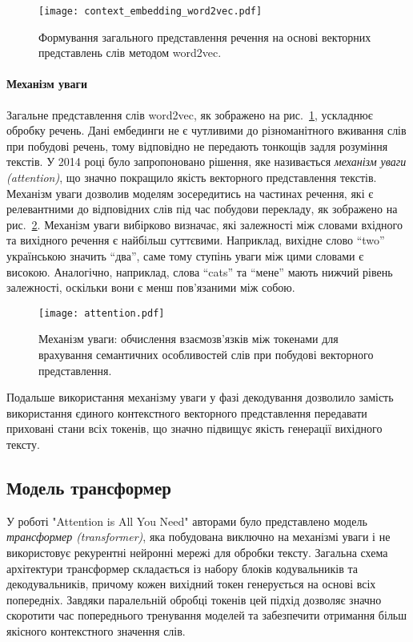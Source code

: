 \begin{figure}[h]
    \centering
    \texttt{[image: context\_embedding\_word2vec.pdf]}
    \caption{Формування загального представлення речення на основі векторних представлень слів методом word2vec.}
    \label{fig:context_embedding_word2vec}
\end{figure}

\paragraph{Механізм уваги}
Загальне представлення слів word2vec, як зображено на рис.~\ref{fig:context_embedding_word2vec}, ускладнює обробку речень. Дані ембединги не є чутливими до різноманітного вживання слів при побудові речень, тому відповідно не передають тонкощів задля розуміння текстів. У 2014 році було запропоновано рішення, яке називається \emph{механізм уваги (attention)}, що значно покращило якість векторного представлення текстів. Механізм уваги дозволив моделям зосередитись на частинах речення, які є релевантними до відповідних слів під час побудови перекладу, як зображено на рис.~\ref{fig:attention}. Механізм уваги вибірково визначає, які залежності між словами вхідного та вихідного речення є найбільш суттєвими. Наприклад, вихідне слово ``two'' українською значить ``два'', саме тому ступінь уваги між цими словами є високою. Аналогічно, наприклад, слова ``cats'' та ``мене'' мають нижчий рівень залежності, оскільки вони є менш пов’язаними між собою.

\begin{figure}[h]
    \centering
    \texttt{[image: attention.pdf]}
    \caption{Механізм уваги: обчислення взаємозв’язків між токенами для врахування семантичних особливостей слів при побудові векторного представлення.}
    \label{fig:attention}
\end{figure}

Подальше використання механізму уваги у фазі декодування дозволило замість використання єдиного контекстного векторного представлення передавати приховані стани всіх токенів, що значно підвищує якість генерації вихідного тексту.

\subsection{Модель трансформер}
У роботі "Attention is All You Need" \cite{vaswani2023attentionneed} авторами було представлено модель \emph{трансформер (transformer)}, яка побудована виключно на механізмі уваги і не використовує рекурентні нейронні мережі для обробки тексту. Загальна схема архітектури трансформер складається із набору блоків кодувальників та декодувальників, причому кожен вихідний токен генерується на основі всіх попередніх. Завдяки паралельній обробці токенів цей підхід дозволяє значно скоротити час попереднього тренування моделей та забезпечити отримання більш якісного контекстного значення слів.


